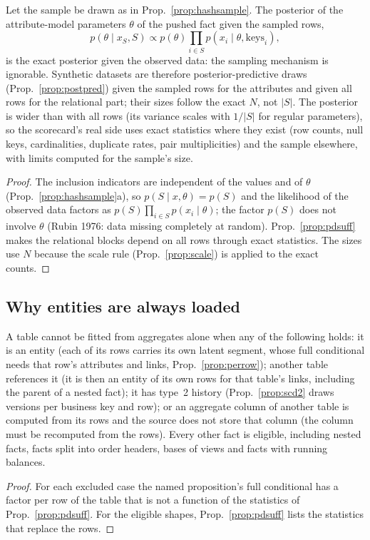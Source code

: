 \begin{proposition}\label{prop:pdsample}
Let the sample be drawn as in Prop.~\ref{prop:hashsample}. The posterior of the attribute-model parameters $\theta$ of the pushed fact given the sampled rows,
\[p(\theta\mid x_S,S)\propto p(\theta)\prod_{i\in S}p(x_i\mid\theta,\text{keys}_i),\]
is the exact posterior given the observed data: the sampling mechanism is ignorable. Synthetic datasets are therefore posterior-predictive draws (Prop.~\ref{prop:postpred}) given the sampled rows for the attributes and given all rows for the relational part; their sizes follow the exact $N$, not $|S|$. The posterior is wider than with all rows (its variance scales with $1/|S|$ for regular parameters), so the scorecard's real side uses exact statistics where they exist (row counts, null keys, cardinalities, duplicate rates, pair multiplicities) and the sample elsewhere, with limits computed for the sample's size.
\end{proposition}
\begin{proof}
The inclusion indicators are independent of the values and of $\theta$ (Prop.~\ref{prop:hashsample}a), so $p(S\mid x,\theta)=p(S)$ and the likelihood of the observed data factors as $p(S)\prod_{i\in S}p(x_i\mid\theta)$; the factor $p(S)$ does not involve $\theta$ (Rubin 1976: data missing completely at random). Prop.~\ref{prop:pdsuff} makes the relational blocks depend on all rows through exact statistics. The sizes use $N$ because the scale rule (Prop.~\ref{prop:scale}) is applied to the exact counts.
\end{proof}

\subsection{Why entities are always loaded}
\begin{proposition}[Eligibility]\label{prop:pdeligible}
A table cannot be fitted from aggregates alone when any of the following holds: it is an entity (each of its rows carries its own latent segment, whose full conditional needs that row's attributes and links, Prop.~\ref{prop:perrow}); another table references it (it is then an entity of its own rows for that table's links, including the parent of a nested fact); it has type~2 history (Prop.~\ref{prop:scd2} draws versions per business key and row); or an aggregate column of another table is computed from its rows and the source does not store that column (the column must be recomputed from the rows). Every other fact is eligible, including nested facts, facts split into order headers, bases of views and facts with running balances.
\end{proposition}
\begin{proof}
For each excluded case the named proposition's full conditional has a factor per row of the table that is not a function of the statistics of Prop.~\ref{prop:pdsuff}. For the eligible shapes, Prop.~\ref{prop:pdsuff} lists the statistics that replace the rows.
\end{proof}

